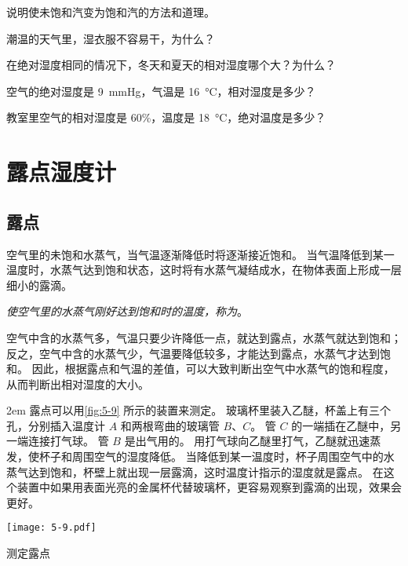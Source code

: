 \begin{Practice}
\begin{question}
\item 说明使未饱和汽变为饱和汽的方法和道理。
\item 潮温的天气里，湿衣服不容易干，为什么？
\item 在绝对湿度相同的情况下，冬天和夏天的相对湿度哪个大？为什么？
\item 空气的绝对湿度是 \qty{9}{mmHg}，气温是 \qty{16}{\celsius}，相对湿度是多少？
\item 教室里空气的相对湿度是 60\%，温度是 \qty{18}{\celsius}，绝对温度是多少？
\end{question}
\end{Practice}

\section{露点\texorpdfstring{\quad}{ }湿度计}
\subsection{露点} 
空气里的未饱和水蒸气，当气温逐渐降低时将逐渐接近饱和。
当气温降低到某一温度时，水蒸气达到饱和状态，这时将有水蒸气凝结成水，在物体表面上形成一层细小的露滴。

\emph{使空气里的水蒸气刚好达到饱和时的温度，称为}。

空气中含的水蒸气多，气温只要少许降低一点，就达到露点，水蒸气就达到饱和；反之，空气中含的水蒸气少，气温要降低较多，才能达到露点，水蒸气才达到饱和。
因此，根据露点和气温的差值，可以大致判断出空气中水蒸气的饱和程度，从而判断出相对湿度的大小。


\medskip\noindent
\begin{minipage}{0.6\linewidth}\parindent2em
露点可以用\cref{fig:5-9} 所示的装置来测定。
玻璃杯里装入乙醚，杯盖上有三个孔，分别插入温度计 $A$ 和两根弯曲的玻璃管 $B$、$C$。
管 $C$ 的一端插在乙醚中，另一端连接打气球。
管 $B$ 是出气用的。
用打气球向乙醚里打气，乙醚就迅速蒸发，使杯子和周围空气的湿度降低。
当降低到某一温度时，杯子周围空气中的水蒸气达到饱和，杯壁上就出现一层露滴，这时温度计指示的湿度就是露点。
在这个装置中如果用表面光亮的金属杯代替玻璃杯，更容易观察到露滴的出现，效果会更好。
\end{minipage}\hfill
\begin{minipage}{0.35\linewidth}\centering
  \begin{figurehere}
    \texttt{[image: 5-9.pdf]}
    \caption{测定露点}\label{fig:5-9}
  \end{figurehere}
\end{minipage}

